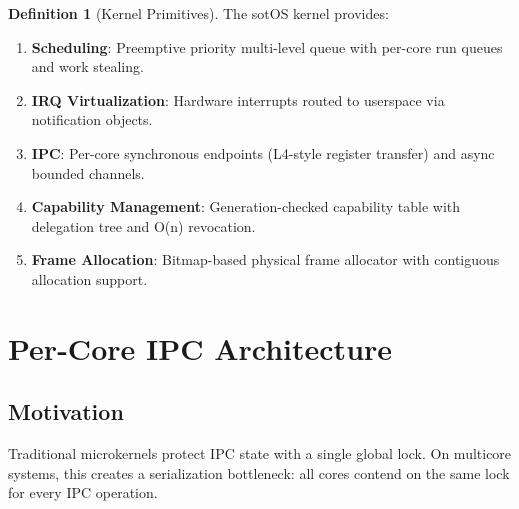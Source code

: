 \documentclass[11pt,letterpaper]{article}
\theoremstyle{definition}
\newtheorem{definition}{Definition}[section]
\begin{document}
\begin{definition}[Kernel Primitives]
The sotOS kernel provides:
\begin{enumerate}[nosep]
    \item \textbf{Scheduling}: Preemptive priority multi-level queue with
          per-core run queues and work stealing.
    \item \textbf{IRQ Virtualization}: Hardware interrupts routed to userspace
          via notification objects.
    \item \textbf{IPC}: Per-core synchronous endpoints (L4-style register
          transfer) and async bounded channels.
    \item \textbf{Capability Management}: Generation-checked capability table
          with delegation tree and O(n) revocation.
    \item \textbf{Frame Allocation}: Bitmap-based physical frame allocator
          with contiguous allocation support.
\end{enumerate}
\end{definition}

\section{Per-Core IPC Architecture}
\label{sec:ipc}

\subsection{Motivation}

Traditional microkernels protect IPC state with a single global lock. On
multicore systems, this creates a serialization bottleneck: all cores contend
on the same lock for every IPC operation.
\end{document}
